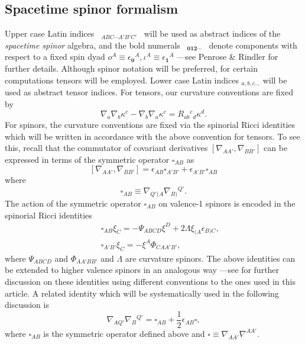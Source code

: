 \documentclass[10pt,a4paper]{article}
\theoremstyle{plain}
\begin{document}
\subsection*{Spacetime spinor formalism}
Upper case Latin indices ~$_{ABC\cdots A'B'C'}$~ will be used as
abstract indices of the \emph{spacetime spinor} algebra, and the bold
numerals ~$_{\bm0\bm1\bm2\cdots}$~ denote components with respect to a
fixed spin dyad $ o^A\equiv
\epsilon_{\bm0}{}^A,\iota^A\equiv\epsilon_{\bm1}{}^A $ ---see Penrose
\& Rindler \cite{PenRin84} for further details.  Although spinor
notation will be preferred, for certain computations tensors will be
employed. Lower case Latin indices $_{a,b,c...}$ will be used as
abstract tensor indices.  For tensors, our curvature conventions are
fixed by
\[\nabla_{a}\nabla_{b}\kappa^c-\nabla_{b}\nabla_{a}\kappa^c=R_{ab}{}^{c}{}_{d}\kappa^{d}.\]
For spinors, the curvature conventions are fixed via the spinorial
Ricci identities which will be written in accordance with the above
convention for tensors.  To see this, recall that the commutator of
covariant derivatives $[ \nabla_{AA'},\nabla_{BB'}]$ can be expressed
in terms of the symmetric operator $\square_{AB}$ as
\[
[ \nabla_{AA'},\nabla_{BB'}]= \epsilon_{AB}\square_{A'B'} +
\epsilon_{A'B'}\square_{AB}
\]
where
\[
\square_{AB} \equiv \nabla_{Q'(A} \nabla_{B)}{}^{Q'}.
\]
 The action of the symmetric operator $\square_{AB}$ on valence-1
 spinors is encoded in the spinorial Ricci identities
\begin{subequations}
\begin{eqnarray}
&& \square_{AB}\xi_{C}=-\Psi_{ABCD} \xi^{D} +
  2\Lambda\xi_{(A}\epsilon_{B)C},
 \label{SpinorialRicciIdentities1} \\
&& \square_{A'B'}\xi_{C}=-\xi^{A}\Phi_{CA A' B'},
\label{SpinorialRicciIdentities2}
\end{eqnarray}
\end{subequations}
where $\Psi_{ABCD}$ and $\Phi_{AA'BB'}$ and $\Lambda$ are curvature spinors.
 The above identities can be extended to higher valence spinors in an
 analogous way ---see \cite{Ste91} for further discussion on these
 identities using different conventions to the ones used in this
 article. A related identity which will be systematically used in the
 following discussion is
\begin{equation}\label{DecomposeDoubleDerivativeContracted}
\nabla_{AQ'}\nabla_{B}{}^{Q'}=\square_{AB}+
\frac{1}{2}\epsilon_{AB}\square,
\end{equation}
where $\square_{AB}$ is the symmetric operator defined above and
$\square \equiv \nabla_{AA'}\nabla^{AA'}.$
\end{document}
